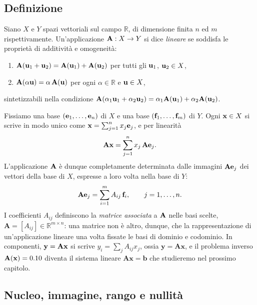 \subsection{Definizione}

Siano $X$ e $Y$ spazi vettoriali sul campo $\mathbb{R}$, di dimensione finita $n$ ed $m$ rispettivamente. Un'applicazione $\mathbf{A}: X \rightarrow Y$ si dice \textit{lineare} se soddisfa le propriet\`a di additivit\`a e omogeneit\`a:
\begin{enumerate}[label=(\roman*)]
	\item $\mathbf{A}(\mathbf{u}_1+\mathbf{u}_2)=\mathbf{A}(\mathbf{u}_1)+\mathbf{A}(\mathbf{u}_2)$ \quad per tutti gli $\mathbf{u}_1$, $\mathbf{u}_2 \in X$,
	\item $\mathbf{A}(\alpha \mathbf{u})=\alpha \,\mathbf{A}(\mathbf{u})$ \quad per ogni $\alpha \in \mathbb{R}$ e $\mathbf{u} \in X$,
\end{enumerate}
sintetizzabili nella condizione $\mathbf{A}(\alpha_1 \mathbf{u}_1 + \alpha_2 \mathbf{u}_2) = \alpha_1 \mathbf{A}(\mathbf{u}_1) + \alpha_2 \mathbf{A}(\mathbf{u}_2)$.

Fissiamo una base $(\mathbf{e}_1,\dots,\mathbf{e}_n)$ di $X$ e una base $(\mathbf{f}_1,\dots,\mathbf{f}_m)$ di $Y$. Ogni $\mathbf{x}\in X$ si scrive in modo unico come $\mathbf{x}=\sum_{j=1}^n x_j\mathbf{e}_j$, e per linearit\`a
	\begin{equation}
		\mathbf{A}\mathbf{x}=\sum_{j=1}^n x_j\,\mathbf{A}\mathbf{e}_j .
	\end{equation}
	L'applicazione $\mathbf{A}$ \`e dunque completamente determinata dalle immagini $\mathbf{A}\mathbf{e}_j$ dei vettori della base di $X$, espresse a loro volta nella base di $Y$:
	\begin{equation}
		\mathbf{A}\mathbf{e}_j=\sum_{i=1}^m A_{ij}\,\mathbf{f}_i, \qquad j=1,\dots,n.
	\end{equation}
	I coefficienti $A_{ij}$ definiscono la \textit{matrice associata} a $\mathbf{A}$ nelle basi scelte, $\bm{A}=[A_{ij}]\in\mathbb{R}^{m\times n}$: una matrice non \`e altro, dunque, che la rappresentazione di un'applicazione lineare una volta fissate le basi di dominio e codominio. In componenti, $\mathbf{y}=\mathbf{A}\mathbf{x}$ si scrive $y_i=\sum_j A_{ij}x_j$, ossia $\bm{y}=\bm{A}\bm{x}$, e il problema inverso $\mathbf{A}(\mathbf{x})=0.10$ diventa il sistema lineare $\bm{A}\bm{x}=\bm{b}$ che studieremo nel prossimo capitolo.



\subsection{Nucleo, immagine, rango e nullit\`a}\label{sez:nucleo_immagine}

